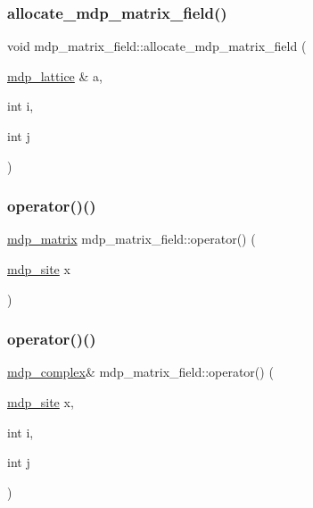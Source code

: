 \subsubsection{\texorpdfstring{allocate\+\_\+mdp\+\_\+matrix\+\_\+field()}{allocate\_mdp\_matrix\_field()}}
{\footnotesize\ttfamily void mdp\+\_\+matrix\+\_\+field\+::allocate\+\_\+mdp\+\_\+matrix\+\_\+field (\begin{DoxyParamCaption}\item[{\hyperlink{classmdp__lattice}{mdp\+\_\+lattice} \&}]{a,  }\item[{int}]{i,  }\item[{int}]{j }\end{DoxyParamCaption})\hspace{0.3cm}{\ttfamily [inline]}}

\mbox{\label{classmdp__matrix__field_ade5f9563b36bcdd98e5341a4a29059fc}} 
\subsubsection{\texorpdfstring{operator()()}{operator()()}\hspace{0.1cm}{\footnotesize\ttfamily [1/3]}}
{\footnotesize\ttfamily \hyperlink{classmdp__matrix}{mdp\+\_\+matrix} mdp\+\_\+matrix\+\_\+field\+::operator() (\begin{DoxyParamCaption}\item[{\hyperlink{classmdp__site}{mdp\+\_\+site}}]{x }\end{DoxyParamCaption})\hspace{0.3cm}{\ttfamily [inline]}}

\mbox{\label{classmdp__matrix__field_afdd2e11b6ab1b36f0bd6e354dbdefe42}} 
\subsubsection{\texorpdfstring{operator()()}{operator()()}\hspace{0.1cm}{\footnotesize\ttfamily [2/3]}}
{\footnotesize\ttfamily \hyperlink{classmdp__complex}{mdp\+\_\+complex}\& mdp\+\_\+matrix\+\_\+field\+::operator() (\begin{DoxyParamCaption}\item[{\hyperlink{classmdp__site}{mdp\+\_\+site}}]{x,  }\item[{int}]{i,  }\item[{int}]{j }\end{DoxyParamCaption})\hspace{0.3cm}{\ttfamily [inline]}}

